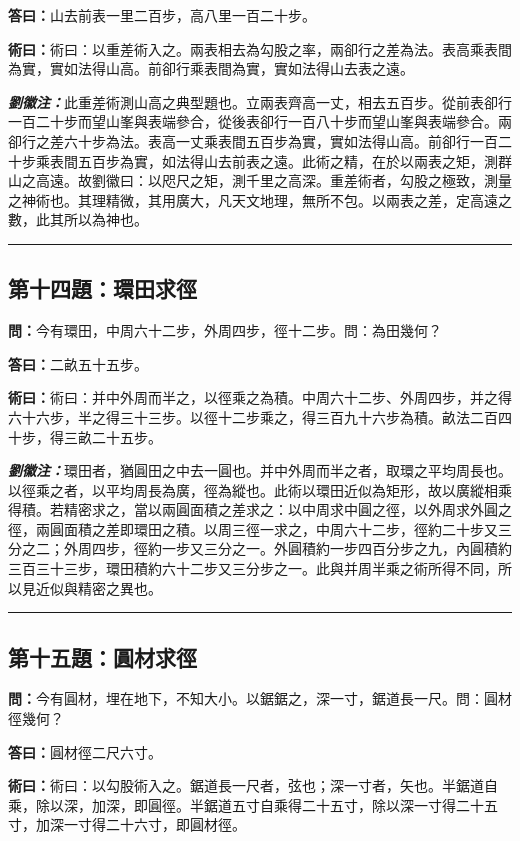 \documentclass[11pt,a4paper]{article}
\newcommand{\wen}[1]{\textbf{\color{problemcolor}問：}#1\par}
\newcommand{\da}[1]{\textbf{答曰：}#1\par}
\newcommand{\shu}[1]{\textbf{術曰：}#1\par}
\newcommand{\liuhui}[1]{{\color{commentarycolor}\textit{\textbf{劉徽注：}}#1\par}}
\begin{document}
\da{山去前表一里二百步，高八里一百二十步。}

\shu{術曰：以重差術入之。兩表相去為勾股之率，兩卻行之差為法。表高乘表間為實，實如法得山高。前卻行乘表間為實，實如法得山去表之遠。}

\liuhui{此重差術測山高之典型題也。立兩表齊高一丈，相去五百步。從前表卻行一百二十步而望山峯與表端參合，從後表卻行一百八十步而望山峯與表端參合。兩卻行之差六十步為法。表高一丈乘表間五百步為實，實如法得山高。前卻行一百二十步乘表間五百步為實，如法得山去前表之遠。此術之精，在於以兩表之矩，測群山之高遠。故劉徽曰：以咫尺之矩，測千里之高深。重差術者，勾股之極致，測量之神術也。其理精微，其用廣大，凡天文地理，無所不包。以兩表之差，定高遠之數，此其所以為神也。}

\bigskip
\hrule
\bigskip

\subsection{第十四題：環田求徑}

\wen{今有環田，中周六十二步，外周四步，徑十二步。問：為田幾何？}

\da{二畝五十五步。}

\shu{術曰：并中外周而半之，以徑乘之為積。中周六十二步、外周四步，并之得六十六步，半之得三十三步。以徑十二步乘之，得三百九十六步為積。畝法二百四十步，得三畝二十五步。}

\liuhui{環田者，猶圓田之中去一圓也。并中外周而半之者，取環之平均周長也。以徑乘之者，以平均周長為廣，徑為縱也。此術以環田近似為矩形，故以廣縱相乘得積。若精密求之，當以兩圓面積之差求之：以中周求中圓之徑，以外周求外圓之徑，兩圓面積之差即環田之積。以周三徑一求之，中周六十二步，徑約二十步又三分之二；外周四步，徑約一步又三分之一。外圓積約一步四百分步之九，內圓積約三百三十三步，環田積約六十二步又三分步之一。此與并周半乘之術所得不同，所以見近似與精密之異也。}

\bigskip
\hrule
\bigskip

\subsection{第十五題：圓材求徑}

\wen{今有圓材，埋在地下，不知大小。以鋸鋸之，深一寸，鋸道長一尺。問：圓材徑幾何？}

\da{圓材徑二尺六寸。}

\shu{術曰：以勾股術入之。鋸道長一尺者，弦也；深一寸者，矢也。半鋸道自乘，除以深，加深，即圓徑。半鋸道五寸自乘得二十五寸，除以深一寸得二十五寸，加深一寸得二十六寸，即圓材徑。}
\end{document}
